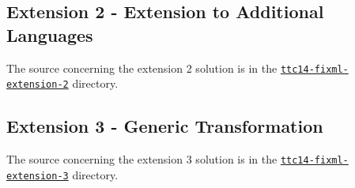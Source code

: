 \subsection{Extension 2 - Extension to Additional Languages}
\label{sec:Extension2}



The source concerning the extension 2 solution is in the \href{https://github.com/fikovnik/ttc14-fixml-sigma/tree/master/ttc14-fixml-extension-2}{\texttt{ttc14-fixml-extension-2}} directory.


\subsection{Extension 3 - Generic Transformation}
\label{sec:Extension3}



The source concerning the extension 3 solution is in the \href{https://github.com/fikovnik/ttc14-fixml-sigma/tree/master/ttc14-fixml-extension-3}{\texttt{ttc14-fixml-extension-3}} directory.

